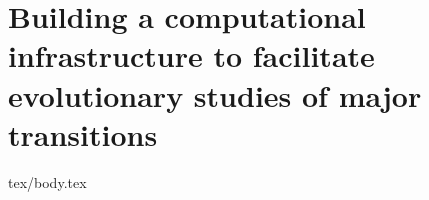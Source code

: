 \chapter{Building a computational infrastructure to facilitate evolutionary studies of major transitions}
\label{ch:infrastructure}

{tex/body.tex}
